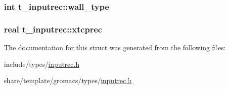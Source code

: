 \hypertarget{structt__inputrec_abf6f03c4c489f1308d2c9941ce2611f0}{
\subsubsection[{wall\-\_\-type}]{\setlength{\rightskip}{0pt plus 5cm}int {\bf t\-\_\-inputrec\-::wall\-\_\-type}}}\label{structt__inputrec_abf6f03c4c489f1308d2c9941ce2611f0}
\hypertarget{structt__inputrec_a2641aa5a451b70cc9faf535a1c1acb80}{
\subsubsection[{xtcprec}]{\setlength{\rightskip}{0pt plus 5cm}real {\bf t\-\_\-inputrec\-::xtcprec}}}\label{structt__inputrec_a2641aa5a451b70cc9faf535a1c1acb80}


\-The documentation for this struct was generated from the following files\-:\begin{DoxyCompactItemize}
\item 
include/types/\hyperlink{include_2types_2inputrec_8h}{inputrec.\-h}\item 
share/template/gromacs/types/\hyperlink{share_2template_2gromacs_2types_2inputrec_8h}{inputrec.\-h}\end{DoxyCompactItemize}
